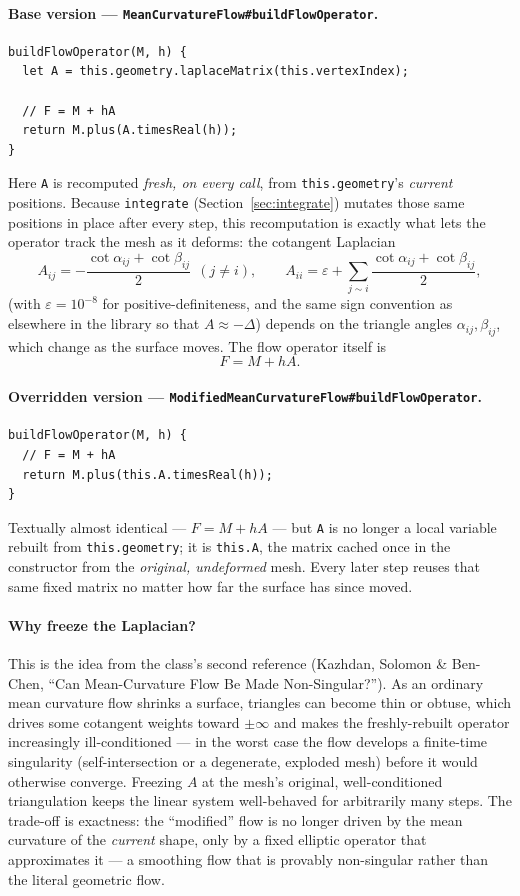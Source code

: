 \documentclass[11pt]{article}
\newcommand{\code}[1]{\texttt{#1}}
\newcommand{\func}[1]{\texttt{\textbf{#1}}}
\begin{document}
\paragraph{Base version --- \func{MeanCurvatureFlow\#buildFlowOperator}.}
\begin{lstlisting}
buildFlowOperator(M, h) {
  let A = this.geometry.laplaceMatrix(this.vertexIndex);

  // F = M + hA
  return M.plus(A.timesReal(h));
}
\end{lstlisting}
Here \code{A} is recomputed \emph{fresh, on every call}, from \code{this.geometry}'s
\emph{current} positions. Because \code{integrate} (Section~\ref{sec:integrate}) mutates
those same positions in place after every step, this recomputation is exactly what lets
the operator track the mesh as it deforms: the cotangent Laplacian
\[
  A_{ij} = -\frac{\cot\alpha_{ij}+\cot\beta_{ij}}{2}\ \ (j\ne i),
  \qquad
  A_{ii} = \varepsilon + \sum_{j\sim i}\frac{\cot\alpha_{ij}+\cot\beta_{ij}}{2},
\]
(with $\varepsilon=10^{-8}$ for positive-definiteness, and the same sign convention as
elsewhere in the library so that $A\approx-\Delta$) depends on the triangle angles
$\alpha_{ij},\beta_{ij}$, which change as the surface moves. The flow operator itself is
\[
  F = M + hA .
\]

\paragraph{Overridden version --- \func{ModifiedMeanCurvatureFlow\#buildFlowOperator}.}
\begin{lstlisting}
buildFlowOperator(M, h) {
  // F = M + hA
  return M.plus(this.A.timesReal(h));
}
\end{lstlisting}
Textually almost identical --- $F=M+hA$ --- but \code{A} is no longer a local variable
rebuilt from \code{this.geometry}; it is \code{this.A}, the matrix cached once in the
constructor from the \emph{original, undeformed} mesh. Every later step reuses that same
fixed matrix no matter how far the surface has since moved.

\paragraph{Why freeze the Laplacian?} This is the idea from the class's second reference
(Kazhdan, Solomon \& Ben-Chen, ``Can Mean-Curvature Flow Be Made Non-Singular?''). As an
ordinary mean curvature flow shrinks a surface, triangles can become thin or obtuse, which
drives some cotangent weights toward $\pm\infty$ and makes the freshly-rebuilt operator
increasingly ill-conditioned --- in the worst case the flow develops a finite-time
singularity (self-intersection or a degenerate, exploded mesh) before it would otherwise
converge. Freezing $A$ at the mesh's original, well-conditioned triangulation keeps the
linear system well-behaved for arbitrarily many steps. The trade-off is exactness: the
``modified'' flow is no longer driven by the mean curvature of the \emph{current} shape,
only by a fixed elliptic operator that approximates it --- a smoothing flow that is provably
non-singular rather than the literal geometric flow.
\end{document}
